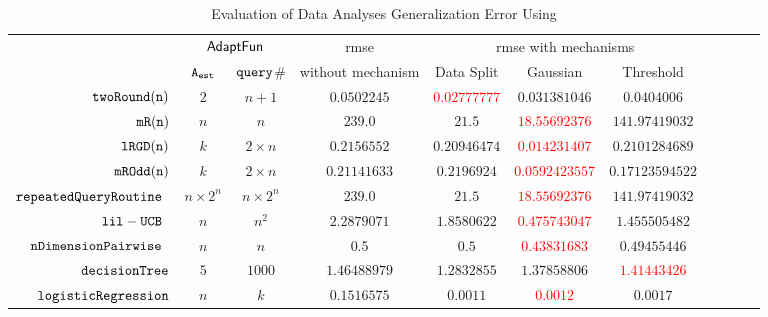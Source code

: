 {\footnotesize
\begin {table}[H]
        \vspace{-0.2cm}
        \caption{Evaluation of Data Analyses Generalization Error Using {\THESYSTEM}}
    \vspace{-0.2cm}
        \label{tb:adapt-generalization}
        \begin{center}
        \centering
{\tiny
        \begin{tabular}{| >{\tiny}r | c | c | c | c | c | c | c | c | c | c  }
         \hline \hline
        \multirow{2}{*}{Program $c$}
         & \multicolumn{2}{c|}{$\textsf{AdaptFun}$}
         & {rmse}
         & \multicolumn{3}{c|}{rmse with mechanisms} \\ 
         \cline{2-3} \cline{5-7}
         & {${\mathtt{A_{est}}}$ } & {${\tt query}$\# } &  without mechanism & Data Split & Gaussian & Threshold  \\ 
         \cline{6-7}
         \hline \hline
         $  \mathtt{ twoRound(n) }$ & $ 2 $ & $  n + 1 $ & $0.0502245$   & \textcolor{red}{$0.02777777$} & {$0.031381046$} & $0.0404006$  \\
         $  \mathtt{ mR(n) }$ & $ n $ & $  n  $ & $239.0$   & $21.5$ & \textcolor{red}{$18.55692376$} & $141.97419032$  \\
         $  \mathtt{ lRGD(n) }$ & $ k $ & $  2\times n $ & $0.2156552$   & $0.20946474$ & \textcolor{red}{$0.014231407$} & $0.2101284689$  \\
         $  \mathtt{ mROdd(n) }$ & $ k $ & $  2 \times n $ & $0.21141633$   & $0.2196924$ & \textcolor{red}{$0.0592423557$} & $0.17123594522$  \\
         $\mathtt{repeatedQueryRoutine}$~\cite{Jamieson2015TheAO} & $ n \times 2^n $ & $  n \times 2^n $ & $239.0$   & $21.5$ & \textcolor{red}{$18.55692376$} & $141.97419032$  \\
         $\mathtt{lil-UCB}$~\cite{Jamieson2015TheAO} & $ n $ & $  n^2 $ & $ 2.2879071$   & $ 1.8580622$ & \textcolor{red}{$0.475743047$} & $ 1.455505482 $  \\
         $\mathtt{nDimensionPairwise}$~\cite{Jamieson2015TheAO} & $ n $ & $  n  $ & $0.5$   & $0.5$ & \textcolor{red}{$ 0.43831683 $} & {$0.49455446$}  \\
         $\mathtt{decisionTree}$ & $5$ &  $1000$ & $ 1.46488979 $  & $ 1.2832855 $ & $ 1.37858806 $ & \textcolor{red}{$1.41443426 $}  \\
         $  \mathtt{logisticRegression}$ & $n$ &  $k$ & $ 0.1516575 $  &  $ 0.0011 $ & \textcolor{red}{$0.0012$} & {$0.0017$}   \\

\end{tabular}}
\end{center}
\end{table}}

